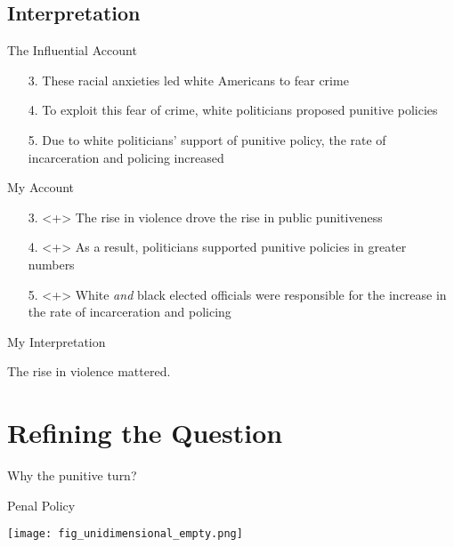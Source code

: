 \documentclass{beamer}
\newcommand{\claimthree}{These racial anxieties led white Americans to fear crime}
\newcommand{\claimfour}{To exploit this fear of crime, white politicians proposed punitive policies}
\newcommand{\claimfive}{Due to white politicians' support of punitive policy, the rate of incarceration and policing increased}
\begin{document}
\subsection{Interpretation}

\begin{frame}{The Influential Account}
\begin{itemize}
    \item[3.] \claimthree
    \item[4.] \claimfour
    \item[5.] \claimfive
\end{itemize}
\end{frame}

\begin{frame}{My Account}
\begin{itemize}
    \item[3.]<+> The rise in violence drove the rise in public punitiveness
    \item[4.]<+> As a result, politicians supported punitive policies in greater numbers
    \item[5.]<+> White \textit{and} black elected officials were responsible for the increase in the rate of incarceration and policing
\end{itemize}
\end{frame}

\begin{frame}{My Interpretation}
\begin{center}
    {\Large The rise in violence mattered.}
\end{center}
\end{frame}


\section{Refining the Question}

\begin{frame}{}
\begin{center}
    {\Large Why the punitive turn?}
\end{center}
\end{frame}

\begin{frame}{Penal Policy}
\begin{center}
    \texttt{[image: fig\_unidimensional\_empty.png]}
\end{center}
\end{frame}
\end{document}
